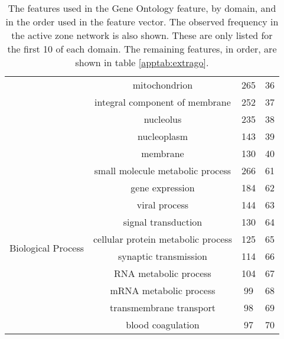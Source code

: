 \begin{table}
\begin{tabular}{l c c c}
                                              & mitochondrion & 265 & 36 \\
                                              & integral component of membrane & 252 & 37 \\
                                              & nucleolus & 235 & 38 \\
                                              & nucleoplasm & 143 & 39 \\
                                              & membrane & 130 & 40 \\
        \hline
        \multirow{10}{*}{Biological Process}  & small molecule metabolic process & 266 & 61 \\
                                              & gene expression & 184 & 62 \\
                                              & viral process & 144 & 63 \\
                                              & signal transduction & 130 & 64 \\
                                              & cellular protein metabolic process & 125 & 65 \\
                                              & synaptic transmission & 114 & 66 \\
                                              & RNA metabolic process & 104 & 67 \\
                                              & mRNA metabolic process & 99 & 68 \\
                                              & transmembrane transport & 98 & 69 \\
                                              & blood coagulation & 97 & 70 \\
    \end{tabular}
    \caption{The features used in the Gene Ontology feature, by domain, and in the order used in the feature vector. The observed frequency in the active zone network is also shown. These are only listed for the first 10 of each domain. The remaining features, in order, are shown in table \ref{apptab:extrago}.}
    \label{apptab:go}
\end{table}

